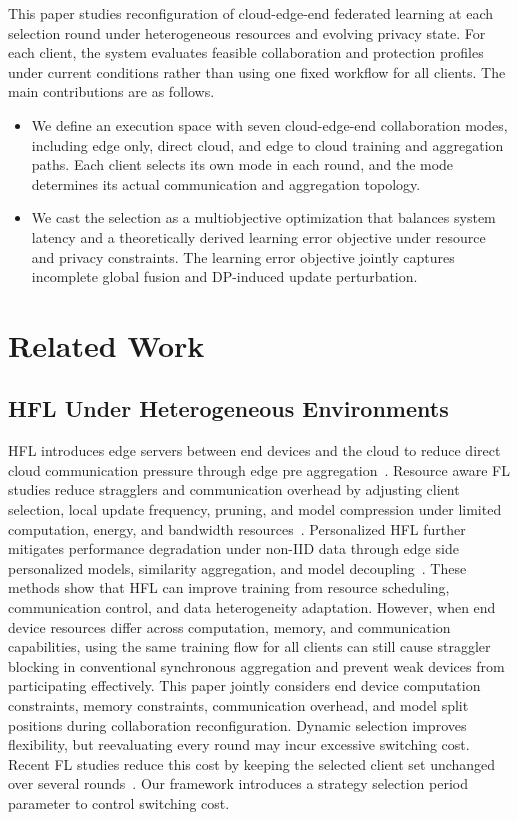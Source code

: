 \documentclass[5p,times]{elsarticle}
\theoremstyle{plain}
\theoremstyle{definition}
\theoremstyle{remark}
\begin{document}
This paper studies reconfiguration of cloud-edge-end federated learning at each
selection round under heterogeneous resources and evolving privacy state. For
each client, the system evaluates feasible collaboration and protection profiles
under current conditions rather than using one fixed workflow for all clients.
The main contributions are as follows.
\begin{itemize}
    \item We define an execution space with seven cloud-edge-end collaboration modes,
    including edge only, direct cloud, and edge to cloud training and aggregation
    paths. Each client selects its own mode in each round, and the mode determines
    its actual communication and aggregation topology.
    \item We cast the selection as a multiobjective optimization that balances system latency and a theoretically derived learning error objective under resource and privacy constraints. The learning error objective jointly captures incomplete global fusion and DP-induced update perturbation.
\end{itemize}

\section{Related Work}
\label{sec:related_work}
\subsection{HFL Under Heterogeneous Environments}
HFL introduces edge servers between end devices and the cloud to reduce direct cloud communication pressure through edge pre aggregation~\cite{hfl}.
Resource aware FL studies reduce stragglers and communication overhead by adjusting client selection, local update frequency, pruning, and model compression under limited computation, energy, and bandwidth resources~\cite{phfl,xu2022adaptive,wang2019adaptivefl,dinh2021wirelessfl}.
Personalized HFL further mitigates performance degradation under non-IID data through edge side personalized models, similarity aggregation, and model decoupling~\cite{Personalizedhfl,JSJX202502007}.
These methods show that HFL can improve training from resource scheduling, communication control, and data heterogeneity adaptation.
However, when end device resources differ across computation, memory, and communication capabilities, using the same training flow for all clients can still cause straggler blocking in conventional synchronous aggregation and prevent weak devices from participating effectively.
This paper jointly considers end device computation constraints, memory constraints, communication overhead, and model split positions during collaboration reconfiguration.
Dynamic selection improves flexibility, but reevaluating every round may incur
excessive switching cost. Recent FL studies reduce this cost by keeping the
selected client set unchanged over several rounds~\cite{CHEN2026112204,10757319}.
Our framework introduces a strategy selection period parameter to control
switching cost.
\end{document}
